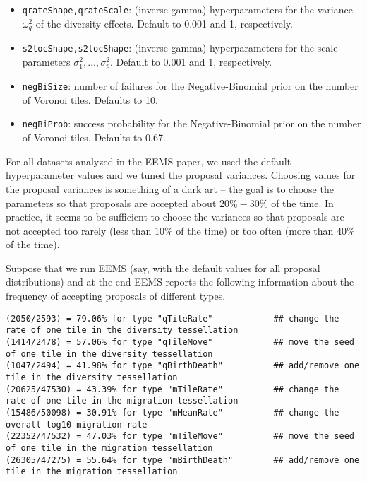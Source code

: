 \documentclass[a4paper,10pt,DIV=15,titlepage,mpinclude=true]{scrartcl}
\newcommand{\keystring}[1]{{\tt #1}}
\begin{document}
\begin{itemize}
\begin{itemize}
  \item \keystring{qrateShape,qrateScale}: (inverse gamma) hyperparameters for the variance $\omega_q^2$ of the diversity effects. Default to 0.001 and 1, respectively.
  \item \keystring{s2locShape,s2locShape}: (inverse gamma) hyperparameters for the scale parameters $\sigma_1^2,\ldots,\sigma_p^2$. Default to 0.001 and 1, respectively.
  \item \keystring{negBiSize}: number of failures for the Negative-Binomial prior on the number of Voronoi tiles. Defaults to 10.
  \item \keystring{negBiProb}: success probability for the Negative-Binomial prior on the number of Voronoi tiles. Defaults to 0.67.
\end{itemize}
\end{itemize}

For all datasets analyzed in the EEMS paper, we used the default hyperparameter values and we tuned the proposal variances. Choosing values for the proposal variances is something of a dark art -- the goal is to choose the parameters so that proposals are accepted about $20\%-30\%$ of the time. In practice, it seems to be sufficient to choose the variances so that proposals are not accepted too rarely (less than $10\%$ of the time) or too often (more than $40\%$ of the time).

Suppose that we run EEMS (say, with the default values for all proposal distributions) and at the end EEMS reports the following information about the frequency of accepting proposals of different types.

\begin{lstlisting}[style=Cppcode]
(2050/2593) = 79.06% for type "qTileRate"            ## change the rate of one tile in the diversity tessellation
(1414/2478) = 57.06% for type "qTileMove"            ## move the seed of one tile in the diversity tessellation
(1047/2494) = 41.98% for type "qBirthDeath"          ## add/remove one tile in the diversity tessellation
(20625/47530) = 43.39% for type "mTileRate"          ## change the rate of one tile in the migration tessellation
(15486/50098) = 30.91% for type "mMeanRate"          ## change the overall log10 migration rate
(22352/47532) = 47.03% for type "mTileMove"          ## move the seed of one tile in the migration tessellation
(26305/47275) = 55.64% for type "mBirthDeath"        ## add/remove one tile in the migration tessellation
\end{lstlisting}
\end{document}
